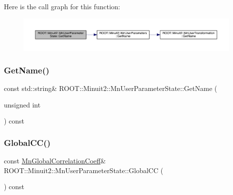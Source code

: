 Here is the call graph for this function\+:\nopagebreak
\begin{figure}[H]
\begin{center}
\leavevmode
\includegraphics[width=350pt]{d3/de0/classROOT_1_1Minuit2_1_1MnUserParameterState_a491c35a111b242ee53a8c150b53da67b_cgraph}
\end{center}
\end{figure}
\mbox{\label{classROOT_1_1Minuit2_1_1MnUserParameterState_a6740898dda45c1f6f485a0a82ce63618}} 
\subsubsection{\texorpdfstring{GetName()}{GetName()}\hspace{0.1cm}{\footnotesize\ttfamily [2/2]}}
{\footnotesize\ttfamily const std\+::string\& R\+O\+O\+T\+::\+Minuit2\+::\+Mn\+User\+Parameter\+State\+::\+Get\+Name (\begin{DoxyParamCaption}\item[{unsigned int}]{ }\end{DoxyParamCaption}) const}

\mbox{\label{classROOT_1_1Minuit2_1_1MnUserParameterState_a92905c9d64bbd5367b339826ca358ee8}} 
\subsubsection{\texorpdfstring{GlobalCC()}{GlobalCC()}\hspace{0.1cm}{\footnotesize\ttfamily [1/2]}}
{\footnotesize\ttfamily const \mbox{\hyperlink{classROOT_1_1Minuit2_1_1MnGlobalCorrelationCoeff}{Mn\+Global\+Correlation\+Coeff}}\& R\+O\+O\+T\+::\+Minuit2\+::\+Mn\+User\+Parameter\+State\+::\+Global\+CC (\begin{DoxyParamCaption}{ }\end{DoxyParamCaption}) const\hspace{0.3cm}{\ttfamily [inline]}}

